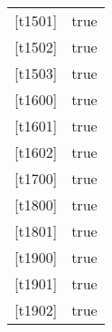 \documentclass[a4]{article}
\begin{document}
\begin{table}[h]
\begin{tabular}{ll}
        \multicolumn{1}{l|}{{[}t1501{]}} & true  \\
        \multicolumn{1}{l|}{{[}t1502{]}} & true  \\
        \multicolumn{1}{l|}{{[}t1503{]}} & true  \\
        \multicolumn{1}{l|}{{[}t1600{]}} & true  \\
        \multicolumn{1}{l|}{{[}t1601{]}} & true  \\
        \multicolumn{1}{l|}{{[}t1602{]}} & true  \\
        \multicolumn{1}{l|}{{[}t1700{]}} & true  \\
        \multicolumn{1}{l|}{{[}t1800{]}} & true  \\
        \multicolumn{1}{l|}{{[}t1801{]}} & true  \\
        \multicolumn{1}{l|}{{[}t1900{]}} & true  \\
        \multicolumn{1}{l|}{{[}t1901{]}} & true  \\
        \multicolumn{1}{l|}{{[}t1902{]}} & true  
    \end{tabular}
\end{table}
\end{document}
